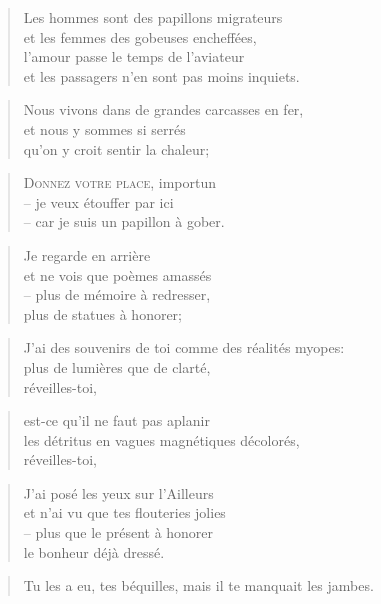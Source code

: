   \begin{verse}
    Les hommes sont des papillons migrateurs\\
    et les femmes des gobeuses encheffées,\\
    l’amour passe le temps de l’aviateur\\
    et les passagers n’en sont pas moins inquiets.
  \end{verse}
  \begin{verse}
    Nous vivons dans de grandes carcasses en fer,\\
    et nous y sommes si serrés\\
    qu’on y croit sentir la chaleur;
  \end{verse}
  \begin{verse}
    \textsc{Donnez votre place}, importun\\
    -- je veux étouffer par ici\\
    -- car je suis un papillon à gober.
  \end{verse}
  \begin{verse}
    Je regarde en arrière\\
    et ne vois que poèmes amassés\\
    -- plus de mémoire à redresser,\\
    plus de statues à honorer;
  \end{verse}
  \begin{verse}
    J’ai des souvenirs de toi comme des réalités myopes:\\
    plus de lumières que de clarté,\\
    réveilles-toi,
  \end{verse}
  \begin{verse}
    est-ce qu’il ne faut pas aplanir\\
    les détritus en vagues magnétiques décolorés,\\
    réveilles-toi,
  \end{verse}
  \begin{verse}
    J’ai posé les yeux sur l’Ailleurs\\
    et n’ai vu que tes flouteries jolies\\
    -- plus que le présent à honorer\\
    le bonheur déjà dressé.
  \end{verse}
  \begin{quotation}
    Tu les a eu, tes béquilles, mais il te manquait les jambes.
  \end{quotation}
